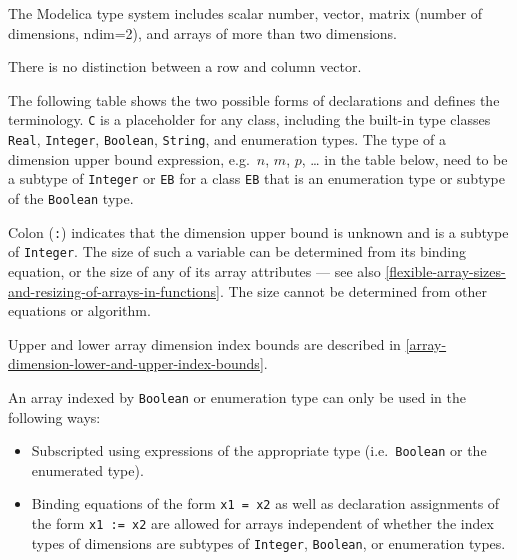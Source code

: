 The Modelica type system includes scalar number, vector, matrix (number
of dimensions, ndim=2), and arrays of more than two dimensions.

\begin{nonnormative}
There is no distinction between a row and column vector.
\end{nonnormative}

The following table shows the two possible forms of declarations and
defines the terminology. \lstinline!C! is a placeholder for any class, including the
built-in type classes \lstinline!Real!, \lstinline!Integer!, \lstinline!Boolean!, \lstinline!String!, and enumeration
types. The type of a dimension upper bound expression, e.g.\ $n$, $m$, $p$, \ldots
in the table below, need to be a subtype of \lstinline!Integer! or \lstinline!EB! for a class \lstinline!EB!
that is an enumeration type or subtype of the \lstinline!Boolean! type.

Colon (\lstinline!:!) indicates that the dimension upper bound is unknown and is a subtype of
\lstinline!Integer!. The size of such a variable can be determined from its binding equation, or the size
of any of its array attributes --- see also \autoref{flexible-array-sizes-and-resizing-of-arrays-in-functions}.
The size cannot be determined from other equations or algorithm.

Upper and lower array dimension index bounds are described in \autoref{array-dimension-lower-and-upper-index-bounds}.

An array indexed by \lstinline!Boolean! or enumeration type can only be used in the following ways:
\begin{itemize}
\item
  Subscripted using expressions of the appropriate type (i.e.\ \lstinline!Boolean! or the enumerated type).
\item
  Binding equations of the form \lstinline!x1 = x2! as well as declaration assignments of the form \lstinline!x1 := x2! are allowed for arrays independent of
  whether the index types of dimensions are subtypes of \lstinline!Integer!, \lstinline!Boolean!, or enumeration types.
\end{itemize}

